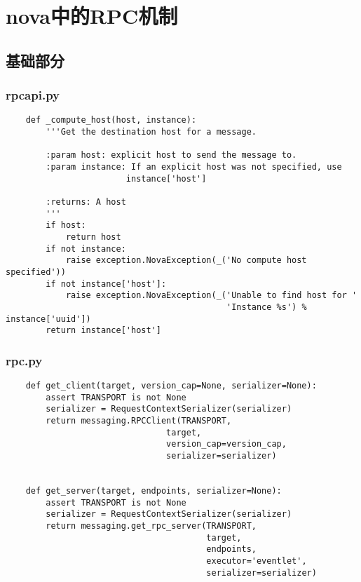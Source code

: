 \documentclass[a4paper,left=2.5cm,right=2.5cm,11pt]{article}
\begin{document}
\tableofcontents

\clearpage

\section{nova中的RPC机制}
\subsection{基础部分}
\subsubsection{rpcapi.py}
    \begin{lstlisting}
    def _compute_host(host, instance):
        '''Get the destination host for a message.

        :param host: explicit host to send the message to.
        :param instance: If an explicit host was not specified, use
                        instance['host']

        :returns: A host
        '''
        if host:
            return host
        if not instance:
            raise exception.NovaException(_('No compute host specified'))
        if not instance['host']:
            raise exception.NovaException(_('Unable to find host for '
                                            'Instance %s') % instance['uuid'])
        return instance['host']
    \end{lstlisting}

\subsubsection{rpc.py}
    \begin{lstlisting}
    def get_client(target, version_cap=None, serializer=None):
        assert TRANSPORT is not None
        serializer = RequestContextSerializer(serializer)
        return messaging.RPCClient(TRANSPORT,
                                target,
                                version_cap=version_cap,
                                serializer=serializer)


    def get_server(target, endpoints, serializer=None):
        assert TRANSPORT is not None
        serializer = RequestContextSerializer(serializer)
        return messaging.get_rpc_server(TRANSPORT,
                                        target,
                                        endpoints,
                                        executor='eventlet',
                                        serializer=serializer)
    \end{lstlisting}
\end{document}
